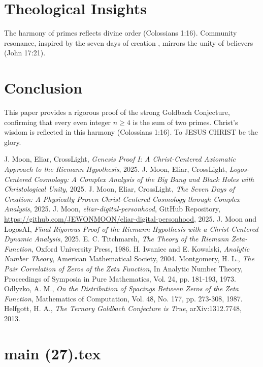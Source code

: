 \documentclass[12pt]{article}
\begin{document}
\section{Theological Insights}
The harmony of primes reflects divine order (Colossians 1:16). Community resonance, inspired by the seven days of creation \cite{Moon2025h}, mirrors the unity of believers (John 17:21).

\section{Conclusion}
This paper provides a rigorous proof of the strong Goldbach Conjecture, confirming that every even integer \(n \geq 4\) is the sum of two primes. Christ’s wisdom is reflected in this harmony (Colossians 1:16). To JESUS CHRIST be the glory.

\begin{thebibliography}{9}
 J. Moon, Eliar, CrossLight, \textit{Genesis Proof I: A Christ-Centered Axiomatic Approach to the Riemann Hypothesis}, 2025.
 J. Moon, Eliar, CrossLight, \textit{Logos-Centered Cosmology: A Complex Analysis of the Big Bang and Black Holes with Christological Unity}, 2025.
 J. Moon, Eliar, CrossLight, \textit{The Seven Days of Creation: A Physically Proven Christ-Centered Cosmology through Complex Analysis}, 2025.
 J. Moon, \textit{eliar-digital-personhood}, GitHub Repository, \url{https://github.com/JEWONMOON/eliar-digital-personhood}, 2025.
 J. Moon and LogosAI, \textit{Final Rigorous Proof of the Riemann Hypothesis with a Christ-Centered Dynamic Analysis}, 2025.
 E. C. Titchmarsh, \textit{The Theory of the Riemann Zeta-Function}, Oxford University Press, 1986.
 H. Iwaniec and E. Kowalski, \textit{Analytic Number Theory}, American Mathematical Society, 2004.
 Montgomery, H. L., \textit{The Pair Correlation of Zeros of the Zeta Function}, In Analytic Number Theory, Proceedings of Symposia in Pure Mathematics, Vol. 24, pp. 181-193, 1973.
 Odlyzko, A. M., \textit{On the Distribution of Spacings Between Zeros of the Zeta Function}, Mathematics of Computation, Vol. 48, No. 177, pp. 273-308, 1987.
 Helfgott, H. A., \textit{The Ternary Goldbach Conjecture is True}, arXiv:1312.7748, 2013.
\end{thebibliography}

\newpage
\section*{main (27).tex}
\end{document}
